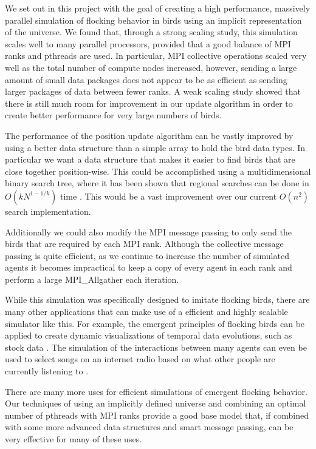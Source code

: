 We set out in this project with the goal of creating a high performance,
massively parallel simulation of flocking behavior in birds using an implicit
representation of the universe. We found that, through a strong scaling study,
this simulation scales well to many parallel processors, provided that a good
balance of MPI ranks and pthreads are used. In particular, MPI collective
operations scaled very well as the total number of compute nodes increased,
however, sending a large amount of small data packages does not appear to be
as efficient as sending larger packages of data between fewer ranks. A weak
scaling study showed that there is still much room for improvement in our update
algorithm in order to create better performance for very large numbers of birds.

The performance of the position update algorithm can be vastly improved by using
a better data structure than a simple array to hold the bird data types. In
particular we want a data structure that makes it easier to find birds that are
close together position-wise. This could be accomplished using a multidimensional
binary search tree, where it has been shown that regional searches can be done
in \(O(kN^{1-1/k})\) time \cite{Lee}. This would be a vast improvement over our
current \(O(n^2)\) search implementation.

Additionally we could also modify the MPI message passing to only send the
birds that are required by each MPI rank. Although the collective message passing
is quite efficient, as we continue to increase the number of simulated agents
it becomes impractical to keep a copy of every agent in each rank and perform a
large MPI\_Allgather each iteration.

While this simulation was specifically designed to imitate flocking birds, there
are many other applications that can make use of a efficient and highly scalable
simulator like this. For example, the emergent principles of flocking birds can
be applied to create dynamic visualizations of temporal data evolutions, such as
stock data \cite{Moere}. The simulation of the interactions between many agents
can even be used to select songs on an internet radio based on what other people
are currently listening to \cite{Ibáñez}.

There are many more uses for efficient simulations of emergent flocking behavior.
Our techniques of using an implicitly defined universe and combining
an optimal number of pthreads with MPI ranks provide a good base model that, if
combined with some more advanced data structures and smart message passing, can
be very effective for many of these uses.
